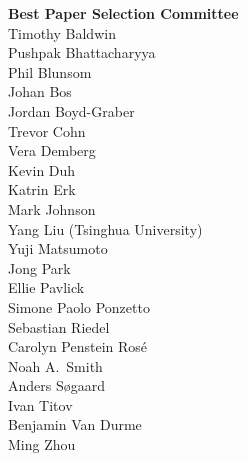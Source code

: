 {\bf Best Paper Selection Committee} \\
Timothy	Baldwin \\
Pushpak	Bhattacharyya \\
Phil	Blunsom \\
Johan	Bos \\
Jordan	Boyd-Graber \\
Trevor	Cohn \\
Vera	Demberg \\
Kevin	Duh \\
Katrin	Erk \\
Mark	Johnson \\
Yang	Liu (Tsinghua University)\\
Yuji	Matsumoto \\
Jong	Park \\
Ellie	Pavlick \\
Simone Paolo	Ponzetto \\
Sebastian	Riedel \\
Carolyn	Penstein Rosé \\
Noah A.~Smith \\
Anders	Søgaard \\
Ivan	Titov \\
Benjamin	Van Durme \\
Ming	Zhou

